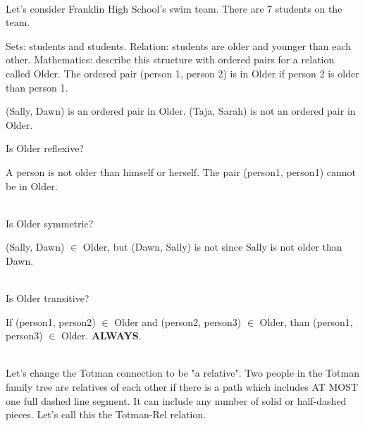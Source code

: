 \documentclass{ximera}
\begin{document}
\begin{example} 
\quad \\
Let's consider Franklin High School's swim team. There are 7 students on the team. 






Sets: students and students.
Relation: students are older and younger than each other.
Mathematics: describe this structure with ordered pairs for a relation called Older. The ordered pair (person 1, person 2) is in Older if person 2 is older than person 1. 

(Sally, Dawn) is an ordered pair in Older.  (Taja, Sarah) is not an ordered pair in Older.

Is Older reflexive? 
\begin{multipleChoice}
\end{multipleChoice}
\begin{feedback}
A person is not older than himself or herself. The pair (person1, person1) cannot be in Older. 
\end{feedback}
\quad \\

Is Older symmetric? 
\begin{multipleChoice}
\end{multipleChoice}
\begin{feedback}
(Sally, Dawn) $\in$ Older, but (Dawn, Sally) is not since Sally is not older than Dawn.
\end{feedback}
\quad \\

Is Older transitive? 
\begin{multipleChoice}
\end{multipleChoice}
\begin{feedback}
If (person1, person2) $\in$ Older and (person2, person3) $\in$ Older, than (person1, person3) $\in$ Older. \textbf{ALWAYS}.   
\end{feedback}
                   
\end{example}
\quad \\                                                                                     



                                                                                                            
Let's change the Totman connection to be "a relative". Two people in the Totman family tree are relatives of each other if there is a path which includes AT MOST one full dashed line segment. It can include any number of solid or half-dashed pieces. Let's call this the Totman-Rel relation.
\end{document}
